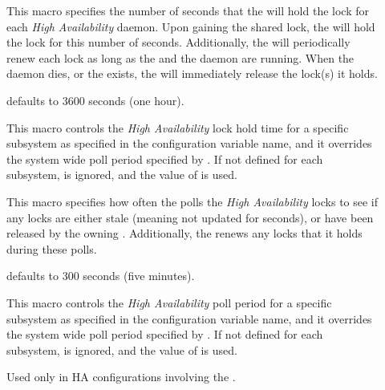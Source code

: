 \begin{description}
\item[] \label{param:HALockHoldTime}
  This macro
  specifies the number of seconds that the  will hold the
  lock for each \emph{High Availability} daemon.
  Upon gaining the shared lock,
  the  will hold the lock for this number of seconds.
  Additionally, the  will periodically renew
  each lock as long as the  and the daemon are running.
  When the daemon dies, or the  exists, the
   will immediately release the lock(s) it holds.

   defaults to 3600 seconds (one hour).

\item[]
  \label{param:HASubsysLockHoldTime}
  This macro controls the \emph{High Availability} lock
  hold time for a specific subsystem
  as specified in the configuration variable name,
  and it overrides the system wide poll period specified by
  .
  If not defined for each subsystem,
   is ignored,
  and the value of  is used.

\item[] \label{param:HALockPollPeriod} 
  This macro specifies how often the  polls the
  \emph{High Availability} locks to see if any locks are either stale
  (meaning not updated for  seconds),
  or have been released by the owning .
  Additionally, the  renews any locks that it
  holds during these polls.

   defaults to 300 seconds (five minutes).

\item[]
  \label{param:HALockPollSubsysPeriod}
  This macro controls the \emph{High Availability} poll period
  for a specific subsystem
  as specified in the configuration variable name,
  and it overrides the system wide poll period specified by
  .
  If not defined for each subsystem,
   is ignored,
  and the value of  is used.

\item[]
  \label{param:MasterSubsysController} Used only in HA configurations
  involving the .


\end{description}
